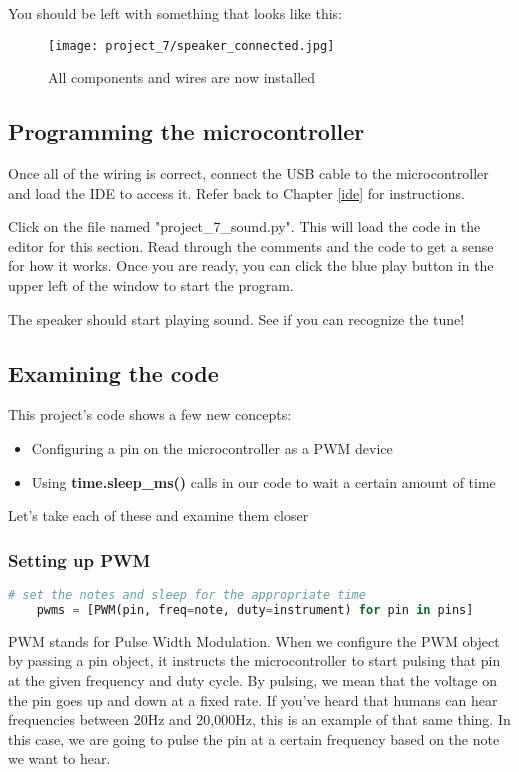 You should be left with something that looks like this:
\begin{figure}[H]
    \centering
    \texttt{[image: project\_7/speaker\_connected.jpg]}
    \caption{All components and wires are now installed}
\end{figure}

\subsection{Programming the microcontroller}
Once all of the wiring is correct, connect the USB cable to the microcontroller and load the IDE to
access it. Refer back to Chapter \ref{ide} for instructions.

Click on the file named "project\_7\_sound.py". This will load the code in the editor for this section. Read through the comments
and the code to get a sense for how it works. Once you are ready, you can click the blue play button in the upper left of the window
to start the program.

The speaker should start playing sound. See if you can recognize the tune!

\subsection{Examining the code}

This project's code shows a few new concepts:
\begin{itemize}
    \item Configuring a pin on the microcontroller as a PWM device
    \item Using \textbf{time.sleep\_ms()} calls in our code to wait a certain amount of time
\end{itemize}

Let's take each of these and examine them closer

\subsubsection{Setting up PWM}
\begin{lstlisting}[language=Python,caption=PWM Mode]
    # set the notes and sleep for the appropriate time
    pwms = [PWM(pin, freq=note, duty=instrument) for pin in pins]
\end{lstlisting}

PWM stands for Pulse Width Modulation. When we configure the PWM object by passing
a pin object, it instructs the microcontroller to start pulsing that pin at the given
frequency and duty cycle. By pulsing, we mean that the voltage on the pin goes up and
down at a fixed rate. If you've heard that humans can hear frequencies between 20Hz and 20,000Hz,
this is an example of that same thing. In this case, we are going to pulse the pin at
a certain frequency based on the note we want to hear.

